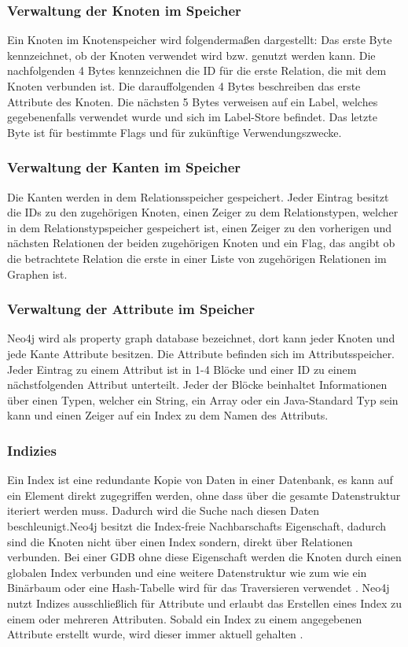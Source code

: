 \subsubsection{Verwaltung der Knoten im Speicher}
Ein Knoten im Knotenspeicher wird folgendermaßen dargestellt: Das erste Byte kennzeichnet, ob der Knoten verwendet wird bzw. genutzt werden kann. Die nachfolgenden 4 Bytes kennzeichnen die ID für die erste Relation, die mit dem Knoten verbunden ist. Die darauffolgenden 4 Bytes beschreiben das erste Attribute des Knoten. Die nächsten 5 Bytes verweisen auf ein Label, welches gegebenenfalls verwendet wurde und sich im Label-Store befindet. Das letzte Byte ist für bestimmte Flags und für zukünftige Verwendungszwecke. 
\subsubsection{Verwaltung der Kanten im Speicher}
Die Kanten werden in dem Relationsspeicher gespeichert. Jeder Eintrag besitzt die IDs zu den zugehörigen Knoten, einen Zeiger zu dem Relationstypen, welcher in dem Relationstypspeicher gespeichert ist, einen Zeiger zu den vorherigen und nächsten Relationen der beiden zugehörigen Knoten und ein Flag, das angibt ob die betrachtete Relation die erste in einer Liste von zugehörigen Relationen im Graphen ist. 
\subsubsection{Verwaltung der Attribute im Speicher}
Neo4j wird als property graph database bezeichnet, dort kann jeder Knoten und jede Kante Attribute besitzen. Die Attribute befinden sich im Attributsspeicher. Jeder Eintrag zu einem Attribut ist in 1-4 Blöcke und einer ID zu einem nächstfolgenden Attribut unterteilt. Jeder der Blöcke beinhaltet Informationen über einen Typen, welcher ein String, ein Array oder ein Java-Standard Typ sein kann und einen Zeiger auf ein Index zu dem Namen des Attributs.  
\subsubsection{Indizies}
Ein Index ist eine redundante Kopie von Daten in einer Datenbank, es kann auf ein Element direkt zugegriffen werden, ohne dass über die gesamte Datenstruktur iteriert werden muss. Dadurch wird die Suche nach diesen Daten beschleunigt.Neo4j besitzt die Index-freie Nachbarschafts Eigenschaft, dadurch sind die Knoten nicht über einen Index  sondern, direkt über Relationen verbunden. Bei einer GDB ohne diese Eigenschaft werden die Knoten durch einen globalen Index verbunden und eine weitere Datenstruktur wie zum wie ein Binärbaum oder eine Hash-Tabelle wird für das Traversieren verwendet \parencite{robinson2013graph}. \newline
Neo4j nutzt Indizes ausschließlich für Attribute und erlaubt das Erstellen eines Index zu einem oder mehreren Attributen. Sobald ein Index zu einem angegebenen Attribute erstellt wurde, wird dieser immer aktuell gehalten \parencite{Index}.  	

